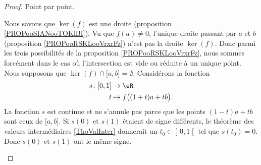 \begin{proof}
    Point par point.
    \begin{subproof}
        Nous savons que \( \ker(f)\) est une droite (proposition \ref{PROPooSIANooTOKlBI}). Vu que \( f(a)\neq 0\), l'unique droite passant par \( a\) et \( b\) (proposition \ref{PROPooRSKLooVrxrFz}) n'est pas la droite \( \ker(f)\). Donc parmi les trois possibilités de la proposition \ref{PROPooRSKLooVrxrFz}, nous sommes forcément dans le cas où l'intersection est vide ou réduite à un unique point.
        Nous supposons que \( \ker(f)\cap\mathopen[ a , b \mathclose]=\emptyset\). Considérons la fonction
        \begin{equation}
            \begin{aligned}
                s\colon \mathopen[ 0 , 1 \mathclose]&\to \eR \\
                t&\mapsto f\big( (1+t)a+tb \big). 
            \end{aligned}
        \end{equation}
        La fonction \( s\) est continue et ne s'annule pas parce que les points \( (1-t)a+tb\) sont ceux de \( \mathopen[ a , b \mathclose]\). Si \( s(0)\) et \( s(1)\) étaient de signe différents, le théorème des valeurs intermédiaires \ref{ThoValInter} donnerait un \( t_0\in\mathopen] 0 , 1 \mathclose[\) tel que \( s(t_0)=0\). Donc \( s(0)\) et \( s(1)\) ont le même signe.



\end{subproof}
\end{proof}
